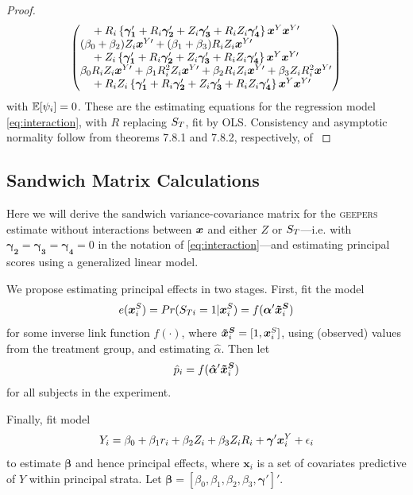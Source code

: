 \documentclass[]{article}
\begin{document}
\begin{proof}
\begin{equation*}
\begin{split}
\begin{pmatrix*}[l]
    \quad {}+\ri\left\{\bm{\gamma_1}'+R_i\bm{\gamma_2}'+Z_i\bm{\gamma_3}'+R_iZ_i\bm{\gamma_4}'\right\}\bxy\bxyt\\
        (\beta_0+\beta_2)Z_i\bxyt+(\beta_1+\beta_3)R_iZ_i\bxyt\\
    \quad {}+Z_i\left\{\bm{\gamma_1}'+R_i\bm{\gamma_2}'+Z_i\bm{\gamma_3}'+R_iZ_i\bm{\gamma_4}'\right\}\bxy\bxyt\\
\beta_0\ri Z_i\bxyt+\beta_1R_i^2Z_i\bxyt+\beta_2\ri Z_i\bxyt+\beta_3Z_iR_i^2\bxyt\\
    \quad {}+\ri Z_i\left\{\bm{\gamma_1}'+R_i\bm{\gamma_2}'+Z_i\bm{\gamma_3}'+R_iZ_i\bm{\gamma_4}'\right\}\bxy\bxyt\\
  \end{pmatrix*}
  \end{split}
\end{equation*}
with $\mathbb{E}[\psi_i]=0$.
These are the estimating equations for the regression model \eqref{eq:interaction}, with $R$ replacing $S_T$, fit by OLS.
Consistency and asymptotic normality follow from theorems 7.8.1 and 7.8.2, respectively, of \citet{boosStefanskiBook}
\end{proof}

\subsection*{Sandwich Matrix Calculations}

Here we will derive the sandwich variance-covariance matrix for the \textsc{geepers} estimate without interactions between $\bm{x}$ and either $Z$ or $S_T$---i.e. with $\bm{\gamma_2}=\bm{\gamma_3}=\bm{\gamma_4}=0$ in the notation of \eqref{eq:interaction}---and estimating principal scores using a generalized linear model.

We propose estimating principal effects in two stages.
First, fit the model
\begin{equation}\label{eq:psMod}
  e(\bm{x}^S_i)=Pr(S_{Ti}=1|\bm{x}^S_i)=f(\bm{\alpha}'\bm{\tilde{x}^S}_i)
\end{equation}
for some inverse link function $f(\cdot)$, where $\bm{\tilde{x}^S}_i=[1,\bm{x}^S_i]$, using (observed) values from the treatment group, and estimating $\hat{\alpha}$.
Then let
\begin{equation}\label{eq:ps}
  \hat{p}_i=f(\bm{\hat{\alpha}}'\bm{\tilde{x}^S}_i)
\end{equation}
for all subjects in the experiment.

Finally, fit model
\begin{equation}\label{eq:regression}
  Y_i=\beta_0+\beta_1r_i+\beta_2Z_i+\beta_3Z_iR_i+\bm{\gamma}'\bm{x}^Y_i+\epsilon_i
\end{equation}
to estimate $\bm{\beta}$ and hence principal effects, where $\bm{x}_i$ is a set of covariates predictive of $Y$ within principal strata.
Let $\bm{\beta}=[\beta_0,\beta_1,\beta_2,\beta_3,\bm{\gamma}']'$.
\end{document}
